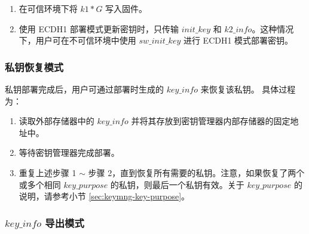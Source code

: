 \documentclass[main\_\_CN.tex]{subfiles}
\begin{document}
\begin{itemize}
    \begin{enumerate}
        \item 在可信环境下将 \hyperref[para:k1G]{\begin{math}k1*G\end{math}} 写入固件。
        \item 使用 ECDH1 部署模式更新密钥时，只传输 \hyperref[para:initkey]{\begin{math}init\_key\end{math}} 和 \hyperref[para:k2info]{\begin{math}k2\_info\end{math}}。这种情况下，用户可在不可信环境中使用 \begin{math}sw\_init\_key\end{math} 进行 ECDH1 模式部署密钥。
    \end{enumerate}
\end{itemize}

\subsubsection{私钥恢复模式}
私钥部署完成后，用户可通过部署时生成的 \hyperref[para:keyinfo]{\begin{math}key\_info\end{math}} 来恢复该私钥。
具体过程为：
\begin{enumerate}
    \item 读取外部存储器中的 \hyperref[para:keyinfo]{\begin{math}key\_info\end{math}} 并将其存放到密钥管理器内部存储器的固定地址中。
    \item 等待密钥管理器完成部署。
    \item 重复上述步骤 1 $\sim$ 步骤 2，直到恢复所有需要的私钥。注意，如果恢复了两个或多个相同 \begin{math}key\_purpose\end{math} 的私钥，则最后一个私钥有效。关于 \begin{math}key\_purpose\end{math} 的说明，请参考小节 \ref{sec:keymng-key-purpose}。
\end{enumerate}

\subsubsection{\begin{math}key\_info\end{math} 导出模式}
\end{document}
